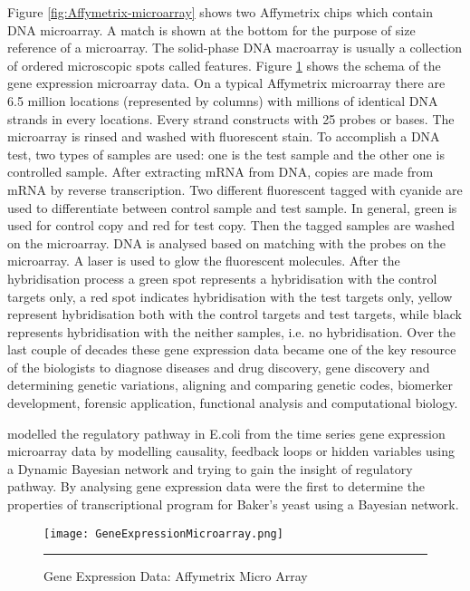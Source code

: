 Figure \ref{fig:Affymetrix-microarray} shows two Affymetrix chips which contain DNA microarray. A match is shown at the bottom for the purpose of size reference of a microarray. The solid-phase DNA macroarray is usually a collection of ordered microscopic spots called features. Figure \ref{fig:Gene Expression Microarray} shows the schema of the gene expression microarray data. On a typical Affymetrix microarray there are 6.5 million locations (represented by columns) with millions of identical DNA strands in every locations. Every strand constructs with 25 probes or bases. The microarray is rinsed and washed with fluorescent stain. To accomplish a DNA test, two types of samples are used: one is the test sample and the other one is controlled sample. After extracting mRNA from DNA, copies are made from mRNA by reverse transcription. Two different fluorescent tagged with cyanide are used to differentiate between control sample and test sample. In general, green is used for control copy and red for test copy. Then the tagged samples are washed on the microarray. DNA is analysed based on matching with the probes on the microarray. A laser is used to glow the fluorescent molecules. After the hybridisation process a green spot represents a hybridisation with the control targets only, a red spot indicates hybridisation with the test targets only, yellow represent hybridisation both with the control targets and test targets, while black represents hybridisation with the neither samples, i.e. no hybridisation. Over the last couple of decades these gene expression data became one of the key resource of the biologists to diagnose diseases and drug discovery, gene discovery and determining genetic variations, aligning and comparing genetic codes, biomerker development, forensic application, functional analysis and computational biology.

\cite{Ong:2002} modelled the regulatory pathway in E.coli from the time series gene expression microarray data by modelling causality, feedback loops or hidden variables using a Dynamic Bayesian network and trying to gain the insight of regulatory pathway. By analysing gene expression data \cite{Friedman:2000} were the first to determine the properties of transcriptional program for Baker's yeast using a Bayesian network.

\begin{figure}[t]
	\centering
	\texttt{[image: GeneExpressionMicroarray.png]}
		\rule{35em}{0.5pt}
	\caption{Gene Expression Data: Affymetrix Micro Array}
	\label{fig:Gene Expression Microarray}
\end{figure}

